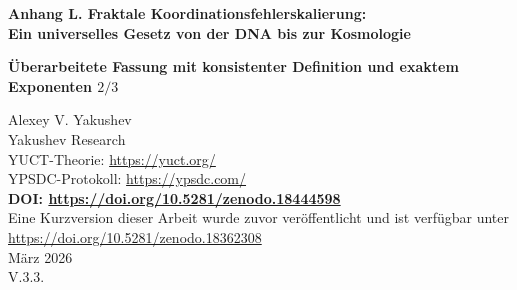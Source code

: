 \documentclass[12pt]{article}
\newcommand{\Keff}{K_{\mathrm{eff}}}
\newcommand{\eps}{\varepsilon}
\newcommand{\kappac}{\kappa_c}
\begin{document}
	
	\begin{titlepage}
		\begin{center}
			\vspace*{1cm}
			\Huge\textbf{Anhang L. Fraktale Koordinationsfehlerskalierung: \\ Ein universelles Gesetz von der DNA bis zur Kosmologie}
			
			\vspace{0.5cm}
			\Large\textbf{Überarbeitete Fassung mit konsistenter Definition und exaktem Exponenten \(2/3\)}
			
			\vspace{1cm}
			\large Alexey V. Yakushev\\
			Yakushev Research\\
			YUCT-Theorie: \url{https://yuct.org/}\\
			YPSDC-Protokoll: \url{https://ypsdc.com/}\\
			
			\vspace{2cm}
			\textbf{DOI: \url{https://doi.org/10.5281/zenodo.18444598}}\\
			
			\vspace{1cm}
			\large 
			Eine Kurzversion dieser Arbeit wurde zuvor veröffentlicht und ist verfügbar unter\\ \url{https://doi.org/10.5281/zenodo.18362308}\\
			\vspace{1cm}
			März 2026 \\ \large V.3.3.
			
			\newpage
			\vspace{1cm}
			\begin{abstract}
				Dieser Anhang präsentiert eine mathematisch konsistente Formulierung eines universellen Skalierungsgesetzes für Koordinationsfehler in komplexen Systemen. Innerhalb der Yakushev Unified Coordination Theory (YUCT) wird die Koordinationseffizienz \(\Keff\) über informationstheoretische Verhältnisse gemäß dem YPSDC-Protokoll definiert. Wir zeigen empirisch, dass der relative Fehler \(\eps\) der Skalierung
				\[
				\eps = \kappac\,\alpha\,\Keff^{-\beta},
				\]
				mit dem exakten Exponenten \(\beta = 2/3\) (empirisch \(0.67 \pm 0.03\)) und dem universellen Vorfaktor \(\kappac = 1/3\) gehorcht. Der Exponent folgt direkt aus der Dreidimensionalität des Koordinationsraums (Theorem 2 des Haupttexts) und der Forderung, dass die Koordinationshierarchie zusammenhängend und azyklisch sein muss (Anhang Y, Abschnitt Y.4.2), während \(\kappac\) den minimalen Restfehler aufgrund der triadischen Struktur \(D+I\!\cdot\!R\) widerspiegelt. Das Gesetz wird über mehr als 50 Größenordnungen hinweg getestet – von atomaren Bindungsenergien bis zu Fluktuationen des kosmischen Mikrowellenhintergrunds – und erklärt innerhalb eines einzigen Rahmens die Herkunft von Potenzgesetzen (Zipf, Allometrie, Gutenberg‑Richter). Überprüfbare Vorhersagen für neuartige Systeme werden formuliert und Einschränkungen explizit diskutiert.
			\end{abstract}
			

\end{center}
\end{titlepage}
\end{document}
